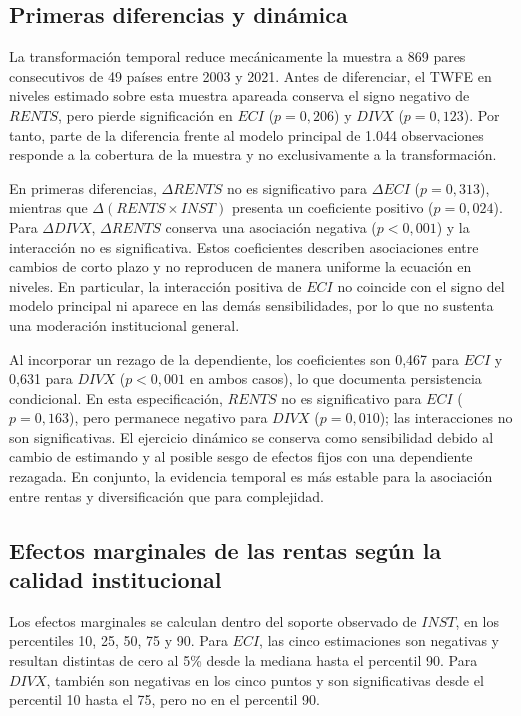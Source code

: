 \documentclass[../../TFM.tex]{subfiles}
\begin{document}
\subsection{Primeras diferencias y dinámica}
\label{subsec:resultados-diferencias-dinamica}

La transformación temporal reduce mecánicamente la muestra a 869 pares
consecutivos de 49 países entre 2003 y 2021. Antes de diferenciar, el TWFE en
niveles estimado sobre esta muestra apareada conserva el signo negativo de
$RENTS$, pero pierde significación en $ECI$ ($p=0,206$) y $DIVX$ ($p=0,123$).
Por tanto, parte de la diferencia frente al modelo principal de 1.044
observaciones responde a la cobertura de la muestra y no exclusivamente a la
transformación.

En primeras diferencias, $\Delta RENTS$ no es significativo para $\Delta ECI$
($p=0,313$), mientras que $\Delta(RENTS\times INST)$ presenta un coeficiente
positivo ($p=0,024$). Para $\Delta DIVX$, $\Delta RENTS$ conserva una asociación
negativa ($p<0,001$) y la interacción no es significativa. Estos coeficientes
describen asociaciones entre cambios de corto plazo y no reproducen de manera
uniforme la ecuación en niveles. En particular, la interacción positiva de
$ECI$ no coincide con el signo del modelo principal ni aparece en las demás
sensibilidades, por lo que no sustenta una moderación institucional general.

Al incorporar un rezago de la dependiente, los coeficientes son 0,467 para
$ECI$ y 0,631 para $DIVX$ ($p<0,001$ en ambos casos), lo que documenta
persistencia condicional. En esta especificación, $RENTS$ no es significativo
para $ECI$ ($p=0,163$), pero permanece negativo para $DIVX$ ($p=0,010$); las
interacciones no son significativas. El ejercicio dinámico se conserva como
sensibilidad debido al cambio de estimando y al posible sesgo de efectos fijos
con una dependiente rezagada. En conjunto, la evidencia temporal es más estable
para la asociación entre rentas y diversificación que para complejidad.

\subsection{Efectos marginales de las rentas según la calidad institucional}
\label{subsec:resultados-efectos-marginales}

Los efectos marginales se calculan dentro del soporte observado de $INST$, en
los percentiles 10, 25, 50, 75 y 90. Para $ECI$, las cinco estimaciones son
negativas y resultan distintas de cero al 5\% desde la mediana hasta el
percentil 90. Para $DIVX$, también son negativas en los cinco puntos y son
significativas desde el percentil 10 hasta el 75, pero no en el percentil 90.
\end{document}
